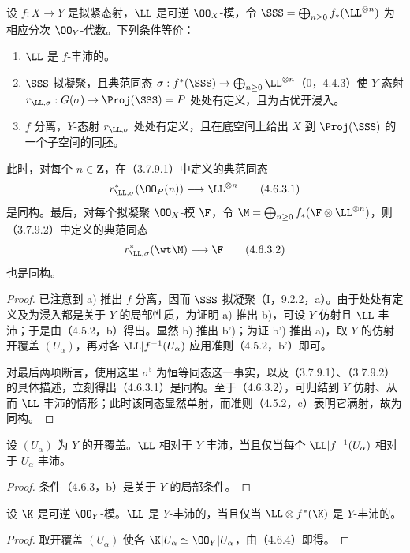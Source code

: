 设 $f:X\to Y$ 是拟紧态射，$\LL$ 是可逆 $\OO_X$-模，令
$\SSS=\bigoplus_{n\geq0}f_*(\LL^{\otimes n})$ 为相应分次 $\OO_Y$-代数。下列条件等价：
\begin{enumerate}[label=\alph*)]
\item $\LL$ 是 $f$-丰沛的。
\item $\SSS$ 拟凝聚，且典范同态
$\sigma:f^*(\SSS)\to\bigoplus_{n\geq0}\LL^{\otimes n}$（0，4.4.3）使 $Y$-态射
$r_{\LL,\sigma}:G(\sigma)\to\Proj(\SSS)=P$ 处处有定义，且为占优开浸入。
\item[\textup{b')}] $f$ 分离，$Y$-态射 $r_{\LL,\sigma}$ 处处有定义，且在底空间上给出 $X$ 到 $\Proj(\SSS)$ 的一个子空间的同胚。
\end{enumerate}
此时，对每个 $n\in\mathbf Z$，在（3.7.9.1）中定义的典范同态
\begin{equation}
r_{\LL,\sigma}^*(\OO_P(n))\longrightarrow\LL^{\otimes n}
\tag{4.6.3.1}
\end{equation}
是同构。最后，对每个拟凝聚 $\OO_X$-模 $\F$，令
$\M=\bigoplus_{n\geq0}f_*(\F\otimes\LL^{\otimes n})$，则（3.7.9.2）中定义的典范同态
\begin{equation}
r_{\LL,\sigma}^*(\wt\M)\longrightarrow\F
\tag{4.6.3.2}
\end{equation}
也是同构。
\begin{proof}
已注意到 a) 推出 $f$ 分离，因而 $\SSS$ 拟凝聚（I，9.2.2，a）。由于处处有定义及为浸入都是关于 $Y$ 的局部性质，为证明 a) 推出 b)，可设 $Y$ 仿射且 $\LL$ 丰沛；于是由（4.5.2，b）得出。显然 b) 推出 b')；为证 b') 推出 a)，取 $Y$ 的仿射开覆盖 $(U_\alpha)$，再对各 $\LL|f^{-1}(U_\alpha)$ 应用准则（4.5.2，b'）即可。

\begin{sloppypar}
对最后两项断言，使用这里 $\sigma^\flat$ 为恒等同态这一事实，以及（3.7.9.1）、（3.7.9.2）的具体描述，立刻得出（4.6.3.1）是同构。至于（4.6.3.2），可归结到 $Y$ 仿射、从而 $\LL$ 丰沛的情形；此时该同态显然单射，而准则（4.5.2，c）表明它满射，故为同构。
\end{sloppypar}
\end{proof}

设 $(U_\alpha)$ 为 $Y$ 的开覆盖。$\LL$ 相对于 $Y$ 丰沛，当且仅当每个 $\LL|f^{-1}(U_\alpha)$ 相对于 $U_\alpha$ 丰沛。
\begin{proof}
条件（4.6.3，b）是关于 $Y$ 的局部条件。
\end{proof}

设 $\K$ 是可逆 $\OO_Y$-模。$\LL$ 是 $Y$-丰沛的，当且仅当 $\LL\otimes f^*(\K)$ 是 $Y$-丰沛的。
\begin{proof}
取开覆盖 $(U_\alpha)$ 使各 $\K|U_\alpha\simeq\OO_Y|U_\alpha$，由（4.6.4）即得。
\end{proof}

